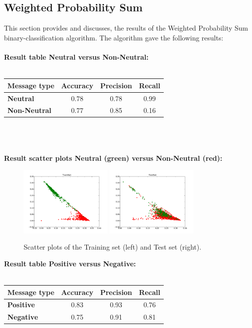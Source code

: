 \documentclass[11pt]{article}
\begin{document}
\subsection{Weighted Probability Sum}
This section provides and discusses, the results of the Weighted Probability Sum binary-classification algorithm. The algorithm gave the following results:\\\\
\textbf{Result table Neutral versus Non-Neutral:}\\\\
\begin{tabular}{| l || c | c | c |}
\hline
\textbf{Message type} & \textbf{Accuracy} & \textbf{Precision} & \textbf{Recall}\\
\hline \hline
\textbf{Neutral} & 0.78 & 0.78 & 0.99\\
\hline
\textbf{Non-Neutral} & 0.77 & 0.85 & 0.16\\
\hline
\end{tabular}\\\\\\
\textbf{Result scatter plots Neutral (green) versus Non-Neutral (red):}
\begin{figure}[!h]
\centering
\includegraphics[width=0.4\textwidth]{NeuNonNeuScatter1.pdf}
\includegraphics[width=0.4\textwidth]{NeuNonNeuScatter2.pdf}
\caption{Scatter plots of the Training set (left) and Test set (right).}
\label{neunon}
\end{figure}
\newpage
\noindent\textbf{Result table Positive versus Negative:}\\\\
\begin{tabular}{| l || c | c | c |}
\hline
\textbf{Message type} & \textbf{Accuracy} & \textbf{Precision} & \textbf{Recall}\\
\hline \hline
\textbf{Positive} & 0.83 & 0.93 & 0.76\\
\hline
\textbf{Negative} & 0.75 & 0.91 & 0.81\\
\hline
\end{tabular}\\\\\\
\end{document}

